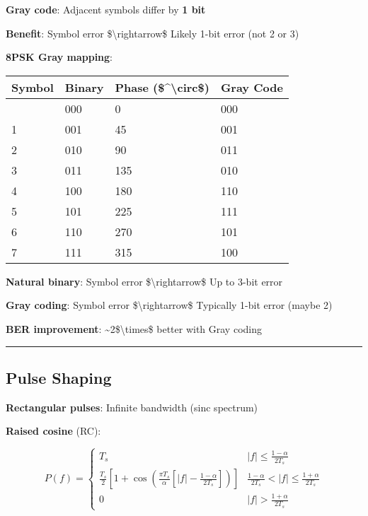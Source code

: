 \textbf{Gray code}: Adjacent symbols differ by \textbf{1 bit}

\textbf{Benefit}: Symbol error \$\textbackslash rightarrow\$ Likely
1-bit error (not 2 or 3)

\textbf{8PSK Gray mapping}:

{\def\LTcaptype{} %
\begin{longtable}[]{@{}llll@{}}
\toprule\noalign{}
Symbol & Binary & Phase (\$\^{}\textbackslash circ\$) & Gray Code \\
\midrule\noalign{}
\endhead
\bottomrule\noalign{}
\endlastfoot
0 & 000 & 0 & 000 \\
1 & 001 & 45 & 001 \\
2 & 010 & 90 & 011 \\
3 & 011 & 135 & 010 \\
4 & 100 & 180 & 110 \\
5 & 101 & 225 & 111 \\
6 & 110 & 270 & 101 \\
7 & 111 & 315 & 100 \\
\end{longtable}
}

\textbf{Natural binary}: Symbol error \$\textbackslash rightarrow\$ Up
to 3-bit error

\textbf{Gray coding}: Symbol error \$\textbackslash rightarrow\$
Typically 1-bit error (maybe 2)

\textbf{BER improvement}: \textasciitilde2\$\textbackslash times\$
better with Gray coding

\begin{center}\rule{0.5\linewidth}{0.5pt}\end{center}

\subsection{Pulse Shaping}\label{pulse-shaping}

\textbf{Rectangular pulses}: Infinite bandwidth (sinc spectrum)

\textbf{Raised cosine} (RC):

\[
P(f) = \begin{cases}
T_s & |f| \leq \frac{1-\alpha}{2T_s} \\
\frac{T_s}{2}\left[1 + \cos\left(\frac{\pi T_s}{\alpha}\left[|f| - \frac{1-\alpha}{2T_s}\right]\right)\right] & \frac{1-\alpha}{2T_s} < |f| \leq \frac{1+\alpha}{2T_s} \\
0 & |f| > \frac{1+\alpha}{2T_s}
\end{cases}
\]

